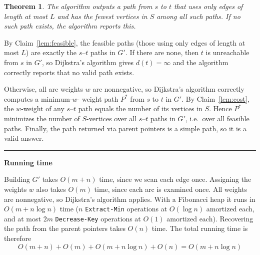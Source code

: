 \documentclass[11pt]{article}
\newenvironment{proof}{{\bf Proof:  }}{\hfill\rule{2mm}{2mm}}
\newtheorem{theorem}[fact]{Theorem}
\begin{document}
\begin{theorem}
The algorithm outputs a path from $s$ to $t$ that uses only edges of length at most $L$ and has the fewest vertices in $S$ among all such paths. 
If no such path exists, the algorithm reports this.
\end{theorem}

\begin{proof}
By Claim~\ref{lem:feasible}, the feasible paths (those using only edges of length at most $L$) are exactly the $s$--$t$ paths in $G'$. 
If there are none, then $t$ is unreachable from $s$ in $G'$, so Dijkstra's algorithm gives $d(t) = \infty$ 
and the algorithm correctly reports that no valid path exists.

Otherwise, all arc weights $w$ are nonnegative, so Dijkstra's algorithm correctly computes a minimum-$w$- weight path $P^*$ from $s$ to $t$ in $G'$. 
By Claim~\ref{lem:cost}, the $w$-weight of any $s$--$t$ path equals the number of its vertices in $S$. 
Hence $P^*$ minimizes the number of $S$-vertices over all $s$--$t$ paths in $G'$, i.e.\ over all feasible paths. 
Finally, the path returned via parent pointers is a simple path, so it is a valid answer.
\end{proof}

\medskip

\textbf{Running time}

Building $G'$ takes $O(m + n)$ time, since we scan each edge once. Assigning the weights $w$ also takes $O(m)$ time, since each arc is examined once. All weights are nonnegative, so Dijkstra's algorithm applies. With a Fibonacci heap it runs in $O(m + n \log n)$ time ($n$ \texttt{Extract-Min} operations at $O(\log n)$ amortized each, and at most $2m$ \texttt{Decrease-Key} operations at $O(1)$ amortized each). Recovering the path from the parent pointers takes $O(n)$ time. The total running time is therefore 
$$O(m+n)+O(m)+O(m+n\log n)+O(n)=O(m+n\log n)$$
\end{document}
